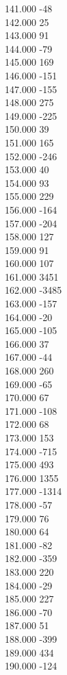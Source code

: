 { 141.000	-48 \\
 142.000	25 \\
 143.000	91 \\
 144.000	-79 \\
 145.000	169 \\
 146.000	-151 \\
 147.000	-155 \\
 148.000	275 \\
 149.000	-225 \\
 150.000	39 \\
 151.000	165 \\
 152.000	-246 \\
 153.000	40 \\
 154.000	93 \\
 155.000	229 \\
 156.000	-164 \\
 157.000	-204 \\
 158.000	127 \\
 159.000	91 \\
 160.000	107 \\
 161.000	3451 \\
 162.000	-3485 \\
 163.000	-157 \\
 164.000	-20 \\
 165.000	-105 \\
 166.000	37 \\
 167.000	-44 \\
 168.000	260 \\
 169.000	-65 \\
 170.000	67 \\
 171.000	-108 \\
 172.000	68 \\
 173.000	153 \\
 174.000	-715 \\
 175.000	493 \\
 176.000	1355 \\
 177.000	-1314 \\
 178.000	-57 \\
 179.000	76 \\
 180.000	64 \\
 181.000	-82 \\
 182.000	-359 \\
 183.000	220 \\
 184.000	-29 \\
 185.000	227 \\
 186.000	-70 \\
 187.000	51 \\
 188.000	-399 \\
 189.000	434 \\
 190.000	-124 \\
}

